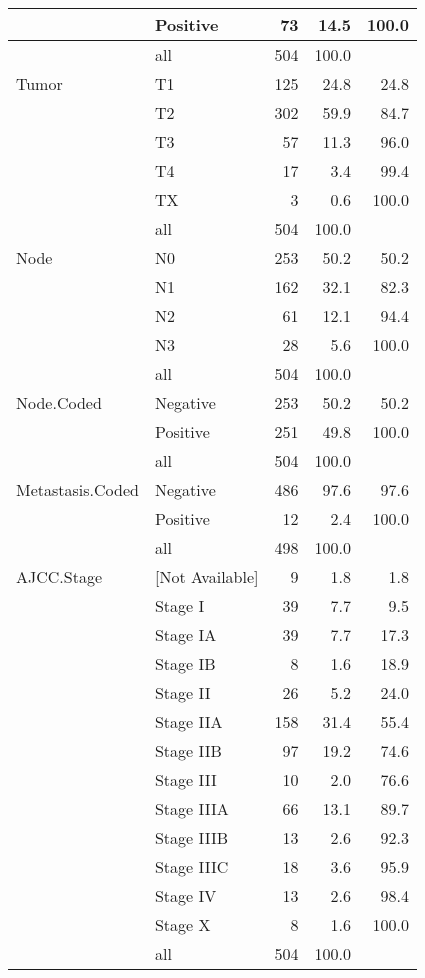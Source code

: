 \begin{longtable}{ll|rrr}
   & Positive & 73 & 14.5 & 100.0 \\ 
   \hline
 & all & 504 & 100.0 &  \\ 
   \hline
\hline
Tumor & T1 & 125 & 24.8 & 24.8 \\ 
   & T2 & 302 & 59.9 & 84.7 \\ 
   & T3 & 57 & 11.3 & 96.0 \\ 
   & T4 & 17 & 3.4 & 99.4 \\ 
   & TX & 3 & 0.6 & 100.0 \\ 
   \hline
 & all & 504 & 100.0 &  \\ 
   \hline
\hline
Node & N0 & 253 & 50.2 & 50.2 \\ 
   & N1 & 162 & 32.1 & 82.3 \\ 
   & N2 & 61 & 12.1 & 94.4 \\ 
   & N3 & 28 & 5.6 & 100.0 \\ 
   \hline
 & all & 504 & 100.0 &  \\ 
   \hline
\hline
Node.Coded & Negative & 253 & 50.2 & 50.2 \\ 
   & Positive & 251 & 49.8 & 100.0 \\ 
   \hline
 & all & 504 & 100.0 &  \\ 
   \hline
\hline
Metastasis.Coded & Negative & 486 & 97.6 & 97.6 \\ 
   & Positive & 12 & 2.4 & 100.0 \\ 
   \hline
 & all & 498 & 100.0 &  \\ 
   \hline
\hline
AJCC.Stage & [Not Available] & 9 & 1.8 & 1.8 \\ 
   & Stage I & 39 & 7.7 & 9.5 \\ 
   & Stage IA & 39 & 7.7 & 17.3 \\ 
   & Stage IB & 8 & 1.6 & 18.9 \\ 
   & Stage II & 26 & 5.2 & 24.0 \\ 
   & Stage IIA & 158 & 31.4 & 55.4 \\ 
   & Stage IIB & 97 & 19.2 & 74.6 \\ 
   & Stage III & 10 & 2.0 & 76.6 \\ 
   & Stage IIIA & 66 & 13.1 & 89.7 \\ 
   & Stage IIIB & 13 & 2.6 & 92.3 \\ 
   & Stage IIIC & 18 & 3.6 & 95.9 \\ 
   & Stage IV & 13 & 2.6 & 98.4 \\ 
   & Stage X & 8 & 1.6 & 100.0 \\ 
   \hline
 & all & 504 & 100.0 &  \\ 

\end{longtable}
